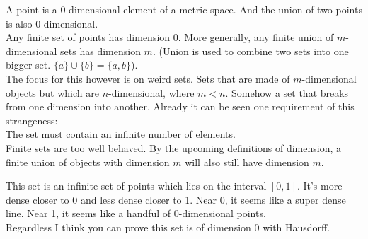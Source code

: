 \documentclass[11pt]{ekblite}
\begin{document}
\begin{example}
	A point is a 0-dimensional element of a metric space. And the union of two points is also 0-dimensional.
	\\[0.2in]Any finite set of points has dimension 0. More generally, any finite union of $m$-dimensional sets has dimension $m$. (Union is used to combine two sets into one bigger set. $\{a\} \cup \{b\} = \{a,b\}$).
	\\[0.2in]The focus for this however is on weird sets. Sets that are made of $m$-dimensional objects but which are $n$-dimensional, where $m < n$. Somehow a set that breaks from one dimension into another. Already it can be seen one requirement of this strangeness:
	\\[0.2in]The set must contain an infinite number of elements.
	\\[0.2in]Finite sets are too well behaved. By the upcoming definitions of dimension, a finite union of objects with dimension $m$ will also still have dimension $m$. 
\end{example}
\begin{example}
	This set is an infinite set of points which lies on the interval $[0,1]$. It's more dense closer to 0 and less dense closer to 1. Near 0, it seems like a super dense line. Near 1, it seems like a handful of 0-dimensional points.
	\\[0.2in]Regardless I think you can prove this set is of dimension 0 with Hausdorff.
\end{example}
\newpage
\end{document}
